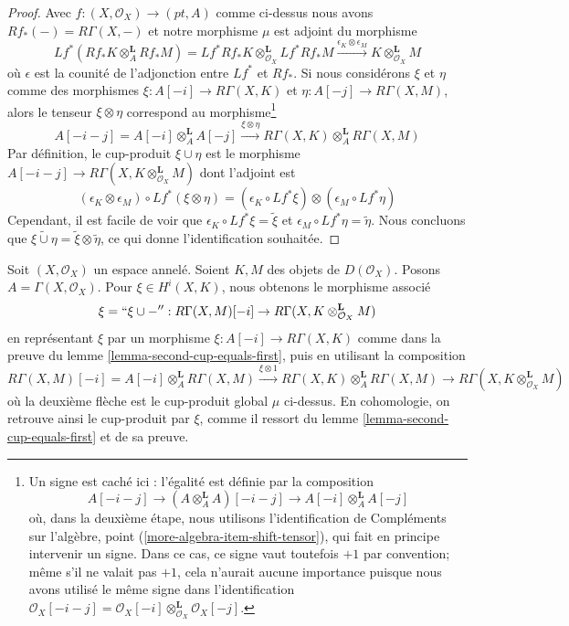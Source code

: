 \begin{proof}

Avec $f : (X, \mathcal{O}_X) \to (pt, A)$ comme ci-dessus nous avons
$Rf_*(-) = R\Gamma(X, -)$ et notre morphisme $\mu$ est adjoint du morphisme
$$
Lf^*(Rf_*K \otimes_A^\mathbf{L} Rf_*M) =
Lf^*Rf_*K \otimes_{\mathcal{O}_X}^\mathbf{L} Lf^*Rf_*M
\xrightarrow{\epsilon_K \otimes \epsilon_M}
K \otimes_{\mathcal{O}_X}^\mathbf{L} M
$$
où $\epsilon$ est la counité de l'adjonction entre
$Lf^*$ et $Rf_*$. Si nous considérons $\xi$ et $\eta$ comme des morphismes $\xi : A[-i] \to R\Gamma(X, K)$
et $\eta : A[-j] \to R\Gamma(X, M)$, alors le tenseur $\xi \otimes \eta$ correspond au morphisme\footnote{Un signe est caché ici : l'égalité est définie par la composition
$$
A[-i - j] \to (A \otimes_A^\mathbf{L} A)[-i - j] \to
A[-i] \otimes_A^\mathbf{L} A[-j]
$$
où, dans la deuxième étape, nous utilisons l'identification de Compléments sur l'algèbre, point (\ref{more-algebra-item-shift-tensor}), qui fait en principe intervenir un signe. Dans ce cas, ce signe vaut toutefois $+1$ par convention; même s'il ne valait pas
$+1$, cela n'aurait aucune importance puisque nous avons utilisé le même signe dans l'identification
$\mathcal{O}_X[-i - j] =
\mathcal{O}_X[-i] \otimes_{\mathcal{O}_X}^\mathbf{L} \mathcal{O}_X[-j]$.}
$$
A[-i - j] = A[-i] \otimes_A^\mathbf{L} A[-j]
\xrightarrow{\xi \otimes \eta}
R\Gamma(X, K) \otimes_A^\mathbf{L} R\Gamma(X, M)
$$
Par définition, le cup-produit $\xi \cup \eta$ est le morphisme
$A[-i - j] \to R\Gamma(X, K \otimes_{\mathcal{O}_X}^\mathbf{L} M)$
dont l'adjoint est
$$
(\epsilon_K \otimes \epsilon_M) \circ Lf^*(\xi \otimes \eta) =
(\epsilon_K \circ Lf^*\xi) \otimes (\epsilon_M \circ Lf^*\eta)
$$
Cependant, il est facile de voir que
$\epsilon_K \circ Lf^*\xi = \tilde \xi$ et
$\epsilon_M \circ Lf^*\eta = \tilde \eta$. Nous concluons que $\widetilde{\xi \cup \eta} = \tilde \xi \otimes \tilde \eta$,
ce qui donne l'identification souhaitée.

\end{proof}

\begin{remark}

\label{remark-cup-with-element-map-total-cohomology}
Soit $(X, \mathcal{O}_X)$ un espace annelé. Soient $K, M$ des objets de $D(\mathcal{O}_X)$. Posons $A = \Gamma(X, \mathcal{O}_X)$. Pour $\xi \in H^i(X, K)$, nous obtenons le morphisme associé $$
\xi = ``\xi \cup -'' :
R\Gamma(X, M)[-i]
\to
R\Gamma(X, K \otimes_{\mathcal{O}_X}^\mathbf{L} M)
$$ en représentant $\xi$ par un morphisme $\xi : A[-i] \to R\Gamma(X, K)$ comme dans la preuve du lemme \ref{lemma-second-cup-equals-first}, puis en utilisant la composition $$
R\Gamma(X, M)[-i] = A[-i] \otimes_A^\mathbf{L} R\Gamma(X, M)
\xrightarrow{\xi \otimes 1}
R\Gamma(X, K) \otimes_A^\mathbf{L} R\Gamma(X, M)
\to
R\Gamma(X, K \otimes_{\mathcal{O}_X}^\mathbf{L} M)
$$ où la deuxième flèche est le cup-produit global $\mu$ ci-dessus. En cohomologie, on retrouve ainsi le cup-produit par $\xi$, comme il ressort du lemme \ref{lemma-second-cup-equals-first} et de sa preuve.
\end{remark}

